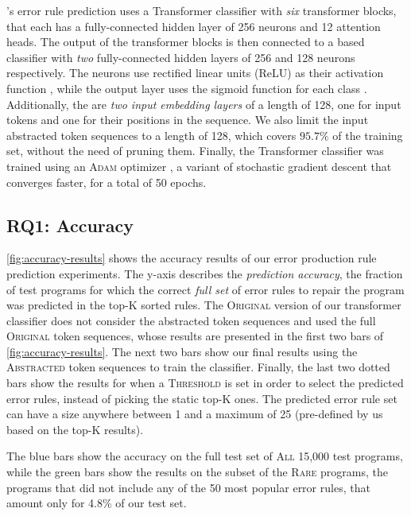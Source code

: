 \toolname's error rule prediction uses a Transformer classifier with \emph{six}
transformer blocks, that each has a fully-connected hidden layer of 256 neurons
and 12 attention heads. The output of the transformer blocks is then connected
to a \dnn based classifier with \emph{two} fully-connected hidden layers of 256
and 128 neurons respectively. The neurons use rectified linear units (ReLU) as
their activation function \citep{Nair2010-xg}, while the output layer uses the
sigmoid function for each class \citep{Nielsen2015-pu}. Additionally, the are
\emph{two input embedding layers} of a length of 128, one for input tokens and
one for their positions in the sequence. We also limit the input
abstracted token sequences to a length of 128, which covers $95.7\%$ of the
training set, without the need of pruning them. Finally, the Transformer
classifier was trained using an \textsc{Adam} optimizer \citep{Kingma2014-ng}, a
variant of stochastic gradient descent that converges faster, for a total of 50
epochs.

\subsection{RQ1: Accuracy}
\label{sec:eval:accuracy}



%
\autoref{fig:accuracy-results} shows the accuracy results of our error
production rule prediction experiments. The y-axis describes the
\emph{prediction accuracy}, \ie the fraction of test programs for which the
correct \emph{full set} of error rules to repair the program was predicted in
the top-K sorted rules.
%
The \textsc{Original} version of our transformer classifier does not consider
the abstracted token sequences and used the full \textsc{Original} token
sequences, whose results are presented in the first two bars of
\autoref{fig:accuracy-results}. The next two bars show our final results using
the \textsc{Abstracted} token sequences to train the classifier. Finally, the
last two dotted bars show the results for when a \textsc{Threshold} is set in
order to select the predicted error rules, instead of picking the static top-K
ones. The predicted error rule set can have a size anywhere between 1 and a
maximum of 25 (pre-defined by us based on the top-K results).

The blue bars show the accuracy on the full test set of \textsc{All} 15,000 test
programs, while the green bars show the results on the subset of the
\textsc{Rare} programs, \ie the programs that did not include any of the 50 most
popular error rules, that amount only for 4.8\% of our test set.

